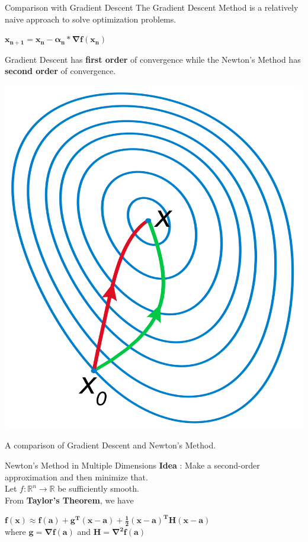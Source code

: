 \documentclass[10pt]{beamer}
\begin{document}
\begin{frame}[fragile]{Comparison with Gradient Descent}
 The Gradient Descent Method is a relatively naive approach to solve optimization problems.
 \begin{center}
     $\boldsymbol{x_{n+1}=x_n-\alpha_n*\nabla f(x_n)}$
 \end{center}
 Gradient Descent has \textbf{first order} of convergence while the Newton's Method has \textbf{second order} of convergence.
 \begin{center}
    \graphicspath{ {./images/} }
    \includegraphics [scale=0.07] {GD}
\end{center}
\begin{center}
A comparison of {\color{green} Gradient Descent} and {\color{red} Newton's Method}.    
\end{center}
\end{frame}

\begin{frame}[fragile]{Newton's Method in Multiple Dimensions}
 \textbf{Idea} : Make a second-order approximation and then minimize that.
 \vspace{2mm}\ \\
 Let $f: \mathbb{R} ^{n} \rightarrow \mathbb{R} $ be sufficiently smooth.
 \vspace{2mm}\ \\
 From \textbf{Taylor's Theorem}, we have \\
 \begin{center}
     $\boldsymbol{f(x) \approx f(a) + g^{T}(x-a) + \frac{1}{2}(x-a)^{T}H(x-a)}$
     \vspace{2mm}\ \\
     where $\boldsymbol{g=\nabla f(a)}$ and $\boldsymbol{H = \nabla ^{2}f(a)}$
 \end{center}
\end{frame}
\end{document}
